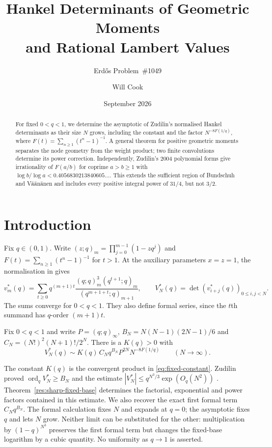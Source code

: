 \documentclass[11pt]{article}
\title{Hankel Determinants of Geometric Moments\\and Rational Lambert Values}
\subtitle{Erd\H{o}s Problem~\#1049}
\author{Will Cook}
\date{September 2026}
\begin{document}
\maketitle
\noteprovenance

\begin{abstract}
For fixed $0<q<1$, we determine the asymptotic of Zudilin's normalised
Hankel determinants as their size $N$ grows, including the constant
and the factor $N^{-8F(1/q)}$, where $F(t)=\sum_{n\ge1}(t^n-1)^{-1}$.
A general theorem for positive geometric moments separates the node
geometry from the weight product; two finite convolutions determine
its power correction. Independently, Zudilin's 2004 polynomial forms
give irrationality of $F(a/b)$ for coprime $a>b\ge1$ with
$\log b/\log a<0.4056830213840605\ldots$. This extends the sufficient
region of Bundschuh and V\"a\"an\"anen and includes every positive
integral power of $31/4$, but not $3/2$.
\end{abstract}

\section{Introduction}\label{sec:problem}

Fix $q\in(0,1)$. Write
$(z;q)_m=\prod_{j=0}^{m-1}(1-zq^j)$ and
$F(t)=\sum_{n\ge1}(t^n-1)^{-1}$ for $t>1$.
At the auxiliary parameters $x=z=1$, the normalisation in
\cite[(6), \S4]{zudilin2016} gives
\begin{equation}\label{eq:normalised-moments}
 v_m^*(q)=\sum_{t\ge0}q^{(m+1)t}
 \frac{(q;q)_m^3(q^{t+1};q)_m}{(q^{m+1+t};q)_{m+1}},
 \qquad V_N^*(q)=\det(v_{i+j}^*(q))_{0\le i,j<N}.
\end{equation}
The sums converge for $0<q<1$. They also define formal series, since
the $t$th summand has $q$-order $(m+1)t$.

\begin{theorem}\label{res:sharp-fixed-base}
Fix $0<q<1$ and write $P=(q;q)_\infty$, $B_N=N(N-1)(2N-1)/6$ and
$C_N=(N!)^2(N+1)!/2^N$. There is a $K(q)>0$ with
\[
 V_N^*(q)\sim K(q)\,C_Nq^{B_N}P^{2N}N^{-8F(1/q)}
 \qquad(N\to\infty).
\]
\end{theorem}

The constant $K(q)$ is the convergent product in
\eqref{eq:fixed-constant}. Zudilin proved
$\operatorname{ord}_q V_N^*\ge B_N$ and the estimate
$|V_N^*|\le q^{N^3/3}\exp(O_q(N^2))$
\cite[Lemma~1 and \S4]{zudilin2016}. Theorem~\ref{res:sharp-fixed-base} determines the factorial, exponential
and power factors contained in this estimate. We also recover the exact
first formal term $C_Nq^{B_N}$. The formal calculation fixes $N$ and
expands at $q=0$; the asymptotic fixes $q$ and lets $N$ grow. Neither
limit can be substituted for the other: multiplication by
$(1-q)^{N^3}$ preserves the first formal term but changes the
fixed-base logarithm by a cubic quantity. No uniformity as $q\to1$
is asserted.
\end{document}
